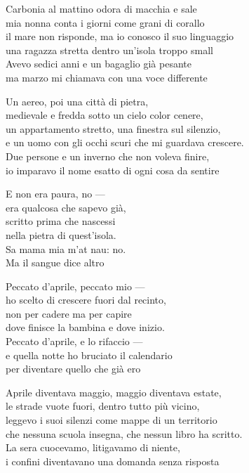 \begin{lyrics}

Carbonia al mattino odora di macchia e sale\\
mia nonna conta i giorni come grani di corallo\\
il mare non risponde, ma io conosco il suo linguaggio\\
una ragazza stretta dentro un’isola troppo small\\
Avevo sedici anni e un bagaglio già pesante\\
ma marzo mi chiamava con una voce differente

Un aereo, poi una città di pietra,\\
medievale e fredda sotto un cielo color cenere,\\
un appartamento stretto, una finestra sul silenzio,\\
e un uomo con gli occhi scuri che mi guardava crescere.\\
Due persone e un inverno che non voleva finire,\\
io imparavo il nome esatto di ogni cosa da sentire

E non era paura, no —\\
era qualcosa che sapevo già,\\
scritto prima che nascessi\\
nella pietra di quest'isola.\\
Sa mama mia m'at nau: no.\\
Ma il sangue dice altro

Peccato d'aprile, peccato mio —\\
ho scelto di crescere fuori dal recinto,\\
non per cadere ma per capire\\
dove finisce la bambina e dove inizio.\\
Peccato d'aprile, e lo rifaccio —\\
e quella notte ho bruciato il calendario\\
per diventare quello che già ero

Aprile diventava maggio, maggio diventava estate,\\
le strade vuote fuori, dentro tutto più vicino,\\
leggevo i suoi silenzi come mappe di un territorio\\
che nessuna scuola insegna, che nessun libro ha scritto.\\
La sera cuocevamo, litigavamo di niente,\\
i confini diventavano una domanda senza risposta


\end{lyrics}
